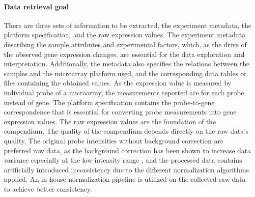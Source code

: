 \paragraph{Data retrieval goal}\label{sec:command-data-goal}

There are three sets of information to be extracted, the experiment
metadata, the platform specification, and the raw expression values.
%
%
The experiment metadata describing the sample attributes and experimental
factors, which, as the drive of the observed gene expression changes, are
essential for the data exploration and interpretation.
%
Additionally, the metadata also specifies the relations between the samples
and the microarray platform used, and the corresponding data tables or files
containing the obtained values.
%
As the expression value is measured by individual probe of a microarray, the
measurements reported are for each probe instead of gene.
%
The platform specification contains the probe-to-gene correspondence that is
essential for converting probe measurements into gene expression values.
%
%
The raw expression values are the foundation of the compendium.  The quality of
the compendium depends directly on the raw data's quality.
%
The original probe intensities without background correction are preferred raw
data, as the background correction has been shown to increase data variance
especially at the low intensity range \cite{Irizarry2006, Ritchie2007}, and
the processed data contains artificially introduced inconsistency due to the
different normalization algorithms applied.
%
An in-house normalization pipeline is utilized on the collected raw data to
achieve better consistency.
%
%
%
